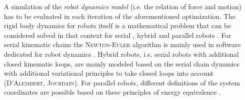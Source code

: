 \documentclass[runningheads]{llncs}
\begin{document}
A simulation of the \emph{robot dynamics model} (i.e. the relation of force and motion) has to be evaluated in each iteration of the aforementioned optimization.
The rigid body dynamics for robots itself is a mathematical problem that can be considered solved in that context for serial \cite{KhalilDom2002}, hybrid \cite{KhalilCre1997,ShiMcP2000,FisettePosSasSam2002,SaminFis2003,Docquier2013} and parallel robots \cite{Merlet2006,BriotKha2015,DoThanhKotHeiOrt2009b,AbdellatifHei2009}.
For serial kinematic chains the \textsc{Newton-Euler} algorithm is mainly used in software dedicated for robot dynamics \cite{KhalilCre1997,KhalilVijKhoMuk2014,SaminFis2003}.
Hybrid robots, i.e. serial robots with additional closed kinematic loops, are mainly modeled based on the serial chain dynamics with additional variational principles to take closed loops into account \cite{SaminFis2003} (\textsc{D'Alembert}, \textsc{Jourdain}). 
For parallel robots, different definitions of the system coordinates are possible based on these principles of energy equivalence \cite{BriotKha2015,DoThanhKotHeiOrt2009b,AbdellatifHei2009}.
\end{document}
